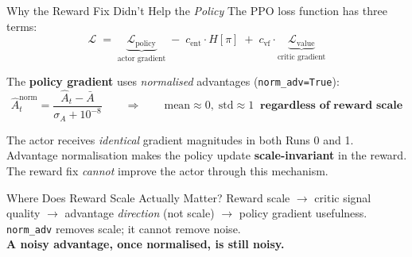 \documentclass[aspectratio=169,11pt]{beamer}
\begin{document}
\begin{frame}{Why the Reward Fix Didn't Help the \emph{Policy}}
  \small
  The PPO loss function has three terms:
  \[
    \mathcal{L} \;=\; \underbrace{\mathcal{L}_\text{policy}}_{\text{actor gradient}}
    \;-\; c_\text{ent} \cdot H[\pi]
    \;+\; c_\text{vf} \cdot \underbrace{\mathcal{L}_\text{value}}_{\text{critic gradient}}
  \]

  The \textbf{policy gradient} uses \emph{normalised} advantages (\texttt{norm\_adv=True}):
  \[
    \hat{A}_t^\text{norm} = \frac{\hat{A}_t - \bar{A}}{\sigma_A + 10^{-8}}
    \qquad\Longrightarrow\qquad
    \text{mean} \approx 0,\; \text{std} \approx 1 \;\;\textbf{regardless of reward scale}
  \]

  \medskip
  \alert{The actor receives \emph{identical} gradient magnitudes in both Runs 0 and 1.}\\
  Advantage normalisation makes the policy update \textbf{scale-invariant} in the reward.\\
  The reward fix \emph{cannot} improve the actor through this mechanism.

  \medskip
  \begin{block}{Where Does Reward Scale Actually Matter?}
    Reward scale $\to$ critic signal quality $\to$ advantage \emph{direction} (not scale)
    $\to$ policy gradient usefulness.  \texttt{norm\_adv} removes scale; it cannot remove noise.\\
    \textbf{A noisy advantage, once normalised, is still noisy.}
  \end{block}
\end{frame}
\end{document}
